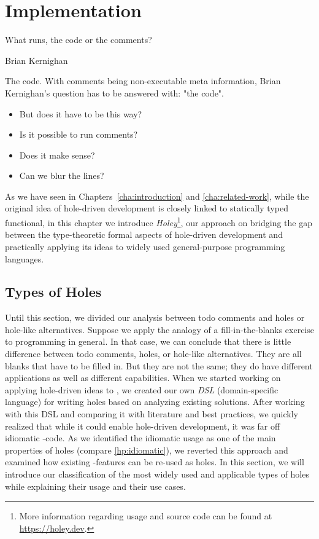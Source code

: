 \chapter{Implementation}
\label{cha:implementation}
\epigraph{What runs, the code or the comments?}{Brian Kernighan}

\noindent
The code.
With comments being non-executable meta information, Brian Kernighan's question has to be answered with: "the code".
\begin{itemize}
    \item But does it have to be this way?
    \item Is it possible to run comments?
    \item Does it make sense?
    \item Can we blur the lines?
\end{itemize}
As we have seen in Chapters~\ref{cha:introduction} and \ref{cha:related-work}, while the original idea of hole-driven development is closely linked to statically typed functional, in this chapter we introduce \emph{Holey}\footnote{More information regarding usage and source code can be found at \url{https://holey.dev}.}, our approach on bridging the gap between the type-theoretic formal aspects of hole-driven development and practically applying its ideas to widely used general-purpose programming languages.

\section{Types of Holes}
Until this section, we divided our analysis between todo comments and holes or hole-like alternatives.
Suppose we apply the analogy of a fill-in-the-blanks exercise to programming in general.
In that case, we can conclude that there is little difference between todo comments, holes, or hole-like alternatives.
They are all blanks that have to be filled in.
But they are not the same; they do have different applications as well as different capabilities.
When we started working on applying hole-driven ideas to \CS, we created our own \emph{DSL} (domain-specific language) for writing holes based on analyzing existing solutions.
After working with this DSL and comparing it with literature and best practices, we quickly realized that while it could enable hole-driven development, it was far off idiomatic \CS-code.
As we identified the idiomatic usage as one of the main properties of holes (compare \ref{hp:idiomatic}), we reverted this approach and examined how existing \CS-features can be re-used as holes.
In this section, we will introduce our classification of the most widely used and applicable types of holes while explaining their usage and their use cases. 

